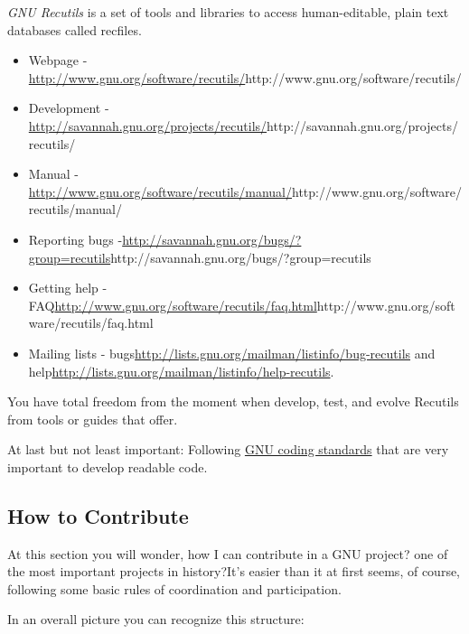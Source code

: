 \textit{GNU Recutils} is a set of tools and libraries to access human-editable, plain text databases called recfiles.

\begin{itemize}
	\item Webpage -\url{http://www.gnu.org/software/recutils/}{http://www.gnu.org/software/recutils/}
	\item Development -\url{http://savannah.gnu.org/projects/recutils/}{http://savannah.gnu.org/projects/recutils/}
	\item Manual -\url{http://www.gnu.org/software/recutils/manual/}{http://www.gnu.org/software/recutils/manual/}
	\item Reporting bugs -\url{http://savannah.gnu.org/bugs/?group=recutils}{http://savannah.gnu.org/bugs/?group=recutils}
	\item Getting help - FAQ\url{http://www.gnu.org/software/recutils/faq.html}{http://www.gnu.org/software/recutils/faq.html}
	\item Mailing lists - bugs\url{http://lists.gnu.org/mailman/listinfo/bug-recutils} and help\url{http://lists.gnu.org/mailman/listinfo/help-recutils}.
\end{itemize}

\par You have total freedom from the moment when develop, test, and evolve Recutils from tools or guides that offer.

\par At last but not least important: Following \href{http://www.gnu.org/prep/standards/}{GNU coding standards} that are very important to develop readable code.

\subsection{How to Contribute}

\par At this section you will wonder, how I can contribute in a GNU project? one of the most important projects in history?It's easier than it at first seems, of course, following some basic rules of coordination and participation.

\par In an overall picture you can recognize this structure:


